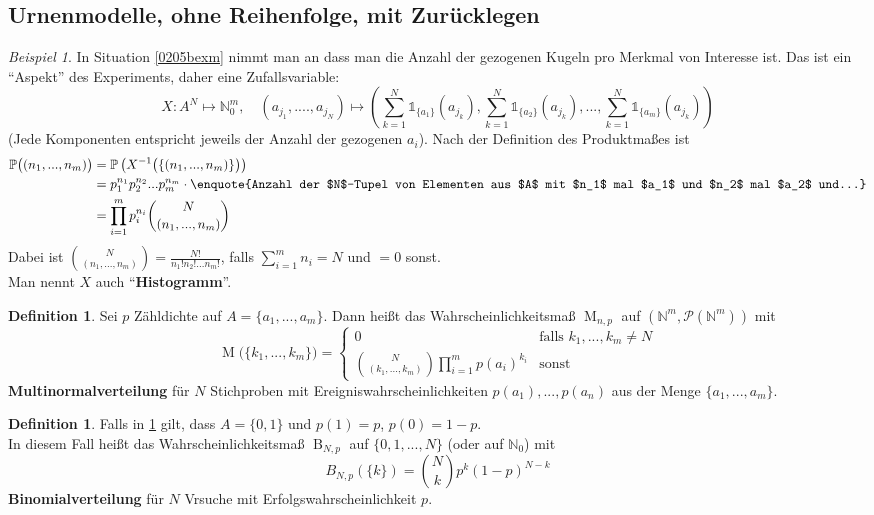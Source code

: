 \documentclass[10pt,a4paper]{article}
\newcommand{\N}{\ensuremath{\mathbb{N}}}
\newcommand{\cha}{\mathds{1}}
\newcommand{\Potset}{\mathscr P}
\newcommand{\Prb}{\mathbb P}
\newcommand{\Mltn}{\operatorname{M}}
\newcommand{\Bin}{\operatorname{B}}
\theoremstyle{plain}
\theoremstyle{definition}
\newtheorem{definition}[theorem]{Definition}
\theoremstyle{remark}
\newtheorem{exm}[theorem]{Beispiel}
\begin{document}
	\subsection{Urnenmodelle, ohne Reihenfolge, mit Zurücklegen}
	\begin{exm}
		In Situation \ref{0205bexm} nimmt man an dass man die Anzahl der gezogenen Kugeln pro Merkmal von Interesse ist.
		Das ist ein \enquote{Aspekt} des Experiments, daher eine Zufallsvariable:
		\[X:A^N\mapsto \N_0^m,\quad (a_{j_1},....,a_{j_N})\mapsto\left(\sum_{k=1}^{N}\cha_{\{a_1\}}(a_{j_k}),\sum_{k=1}^{N}\cha_{\{a_2\}}(a_{j_k}),...,\sum_{k=1}^{N}\cha_{\{a_m\}}(a_{j_k})\right)\]
		(Jede Komponenten entspricht jeweils der Anzahl der gezogenen $a_i$). Nach der Definition des Produktmaßes ist
		\begin{align*}
		\Prb\big((n_1,...,n_m)\big)&=\Prb \left(X^{-1}\big(\{(n_1,...,n_m)\}\big)\right)\\
		&=p_1^{n_1}p_2^{n_2}...p_m^{n_m}\cdot\text{\enquote{Anzahl der $N$-Tupel von Elementen aus $A$ mit $n_1$ mal $a_1$ und $n_2$ mal $a_2$ und...}}\\
		&=\prod_{i=1}^{m}p_i^{n_i}\binom{N}{(n_1,...,n_m)}
		\end{align*}
		Dabei ist $\binom{N}{(n_1,...,n_m)}=\frac{N!}{n_1!n_2!...n_m!}$, falls $\sum_{i=1}^{m}n_i=N$ und $=0$ sonst.\\
		Man nennt $X$ auch \enquote{\textbf{Histogramm}}.
	\end{exm}
	\begin{definition}\label{0209adef}
		Sei $p$ Zähldichte auf $A=\{a_1,...,a_m\}$. Dann heißt das Wahrscheinlichkeitsmaß $\Mltn_{n,p}$ auf $(\N^m,\Potset(\N^m))$ mit
		\[\Mltn\big(\{k_1,...,k_m\}\big)=\begin{cases}
		0&\text{falls $k_1,...,k_m\neq N$}\\
		\binom{N}{(k_1,...,k_m)}\prod_{i=1}^mp(a_i)^{k_i}&\text{sonst}
		\end{cases}\]
		\textbf{Multinormalverteilung} für $N$ Stichproben mit Ereigniswahrscheinlichkeiten $p(a_1),...,p(a_n)$ aus der Menge $\{a_1,...,a_m\}$.
	\end{definition}
	\addtocounter{theorem}{-1}
	\begin{definition}\label{0209bdef}
		Falls in \ref{0209adef} gilt, dass $A=\{0,1\}$ und $p(1)=p$, $p(0)=1-p$. \\
		In diesem Fall heißt das Wahrscheinlichkeitsmaß $\Bin_{N,p}$ auf $\{0,1,...,N\}$ (oder auf $\N_0$) mit
		\[B_{N,p}(\{k\})=\binom{N}{k}p^k(1-p)^{N-k}\]
		\textbf{Binomialverteilung} für $N$ Vrsuche mit Erfolgswahrscheinlichkeit $p$.
	\end{definition}
	
\end{document}
